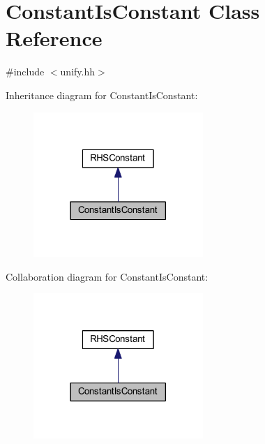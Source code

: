 \hypertarget{class_constant_is_constant}{}\section{Constant\+Is\+Constant Class Reference}
\label{class_constant_is_constant}


{\ttfamily \#include $<$unify.\+hh$>$}



Inheritance diagram for Constant\+Is\+Constant\+:
\nopagebreak
\begin{figure}[H]
\begin{center}
\leavevmode
\includegraphics[width=182pt]{class_constant_is_constant__inherit__graph}
\end{center}
\end{figure}


Collaboration diagram for Constant\+Is\+Constant\+:
\nopagebreak
\begin{figure}[H]
\begin{center}
\leavevmode
\includegraphics[width=182pt]{class_constant_is_constant__coll__graph}
\end{center}
\end{figure}
